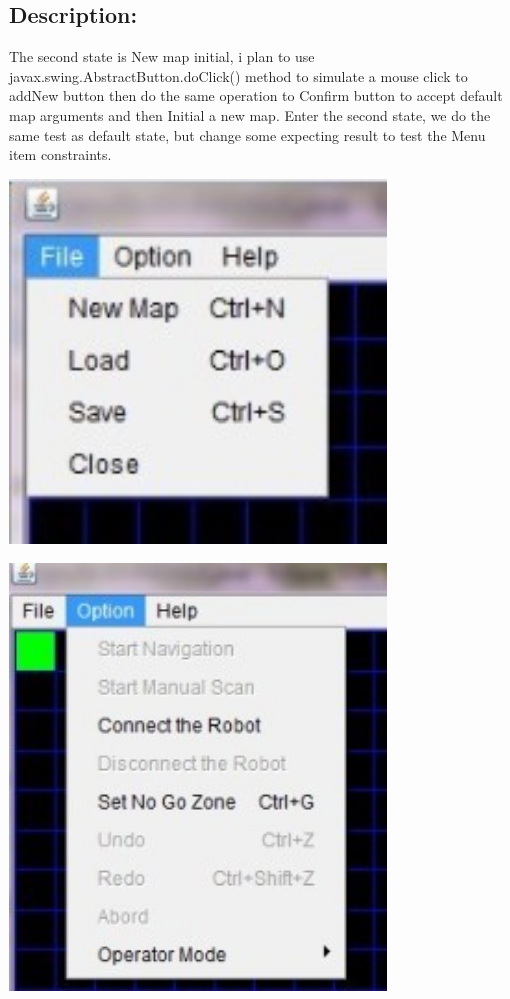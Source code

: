 \documentclass[11pt, a4paper]{report}
\begin{document}
\subsection{Description:}
The second state is New map initial, i plan to use javax.swing.AbstractButton.doClick() method to simulate a mouse click to addNew button then do the same operation to Confirm button to accept default map arguments and then Initial a new map. Enter the second state, we do the same test as default state, but change some expecting result to test the Menu item constraints.
\begin{center}
 \includegraphics[width=10cm]{FileMenuNewMapInitial}
 \end{center}
 \begin{center}
 \includegraphics[width=10cm]{OptionMenuNewMapInitial}
\end{center}
\end{document}
